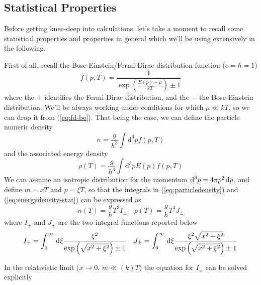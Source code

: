 \subsection{Statistical Properties}

Before getting knee-deep into calculations, let's take a moment to recall some statistical properties and properties in general which we'll be using extensively in the following.
\par First of all, recall the Bose-Einstein/Fermi-Dirac distribution function ($c=\hbar = 1$)
\begin{equation}
    f(p,T) = \frac{1}{\exp\left(\frac{E(p)-\mu}{kT}\right) \pm 1}
    \label{eq:fd-be}
\end{equation}
where the $+$ identifies the Fermi-Dirac distribution, and the $-$ the Bose-Einstein distribution. We'll be always working under conditions for which $\mu \ll kT$, so we can drop it from (\ref{eq:fd-be}). That being the case, we can define the particle numeric density
\begin{equation}
    n = \frac{g}{h^{3}} \int \text{d}^{3}p f(p,T)
    \label{eq:particledensity}
\end{equation}
and the associated energy density
\begin{equation}
    \rho(T) = \frac{g}{h^{3}}\int \text{d}^{3}p E(p)f(p,T)
    \label{eq:energydensity-stat}
\end{equation}
We can assume an isotropic distribution for the momentum $\text{d}^{3}p = 4\pi p^{2}\,\text{d}p$, and define $m = xT$ and $p = \xi T$, so that the integrals in (\ref{eq:particledensity}) and (\ref{eq:energydensity-stat}) can be expressed as 
\begin{equation}
    n(T) = \frac{g}{h}T^{3}I_{\pm} \quad \rho(T) = \frac{g}{h}T^{4}J_{\pm}
\end{equation}
where $I_{\pm}$ and $J_{\pm}$ are the two integral functions reported below
\begin{equation}
    I_{\pm} = \int_{0}^{\infty} \,\text{d}\xi \frac{\xi^{2}}{\exp\left(\sqrt{x^{2}+\xi^{2}}\right)\pm 1} \quad J_{\pm} = \int_{0}^{\infty} \,\text{d}\xi \frac{\xi^{2}\sqrt{x^{2}+\xi^{2}}}{\exp\left(\sqrt{x^{2}+\xi^{2}}\right)\pm 1}
\end{equation}
\par In the relativistic limit ($x \to 0$, $m \ll (k)T$) the equation for $I_{\pm}$ can be solved explicitly
